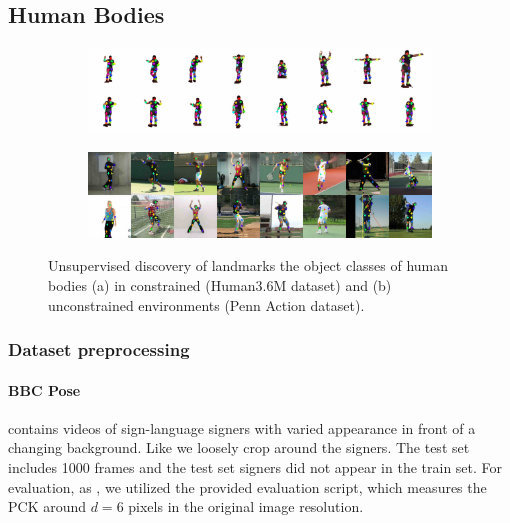 	\subsection{Human Bodies}\label{sec:kp_humanbodies}
		\begin{figure}[htp]
			\centering
			\begin{subfigure}{1.\textwidth}
			\includegraphics[trim={0cm 0cm 0cm 0cm},clip, width=1.\linewidth]{fig/shape/0human}\caption{}
			\end{subfigure}
			\begin{subfigure}{1.\textwidth}
			\includegraphics[trim={0cm 0cm 0cm 0cm},clip, width=1.\linewidth]{fig/shape/0penn}\caption{}
			\end{subfigure}
			\caption{{Unsupervised discovery of landmarks the object classes of human bodies (a) in constrained (Human3.6M dataset) and (b) unconstrained environments (Penn Action dataset).}}
			\label{fig:kp_bodies}
		\end{figure}

		\subsubsection{Dataset preprocessing}
			\paragraph{BBC Pose} \cite{charles13bbcpose} contains videos of sign-language signers with varied appearance in front of a changing background. Like \cite{jakab18} we loosely crop around the signers.
			The test set includes 1000 frames and the test set signers did not appear in the train set.
			For evaluation, as \cite{jakab18}, we utilized the provided evaluation script, which measures the PCK around $d=6$ pixels in the original image resolution.


